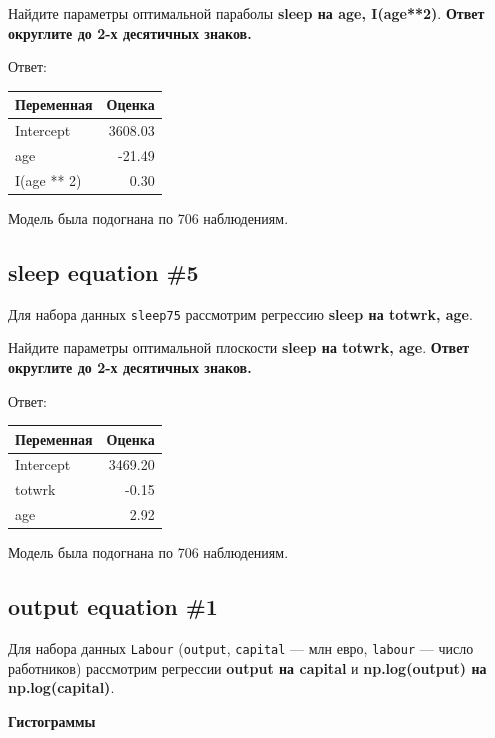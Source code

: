 \documentclass[
  russian,
]{article}
\newcounter{none} %
\begin{document}
Найдите параметры оптимальной параболы \textbf{sleep на age, I(age**2)}.
\textbf{Ответ округлите до 2-х десятичных знаков.}

Ответ:

{\def\LTcaptype{none} %
\begin{longtable}[]{@{}lr@{}}
\toprule\noalign{}
Переменная & Оценка \\
\midrule\noalign{}
\endhead
\bottomrule\noalign{}
\endlastfoot
Intercept & 3608.03 \\
age & -21.49 \\
I(age ** 2) & 0.30 \\
\end{longtable}
}

Модель была подогнана по 706 наблюдениям.

\subsection{sleep equation \#5}\label{sleep-equation-5}

Для набора данных \texttt{sleep75} рассмотрим регрессию \textbf{sleep на
totwrk, age}.

Найдите параметры оптимальной плоскости \textbf{sleep на totwrk, age}.
\textbf{Ответ округлите до 2-х десятичных знаков.}

Ответ:

{\def\LTcaptype{none} %
\begin{longtable}[]{@{}lr@{}}
\toprule\noalign{}
Переменная & Оценка \\
\midrule\noalign{}
\endhead
\bottomrule\noalign{}
\endlastfoot
Intercept & 3469.20 \\
totwrk & -0.15 \\
age & 2.92 \\
\end{longtable}
}

Модель была подогнана по 706 наблюдениям.

\subsection{output equation \#1}\label{output-equation-1}

Для набора данных \texttt{Labour} (\texttt{output}, \texttt{capital} ---
млн евро, \texttt{labour} --- число работников) рассмотрим регрессии
\textbf{output на capital} и \textbf{np.log(output) на np.log(capital)}.

\textbf{Гистограммы}
\end{document}
